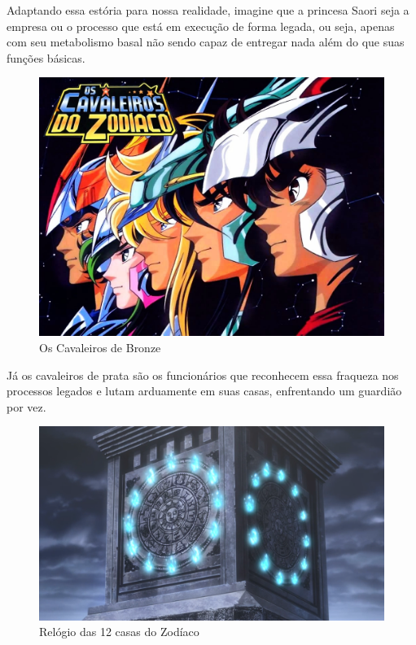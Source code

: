 Adaptando essa estória para nossa realidade, imagine que a princesa Saori seja a empresa ou o processo que está em execução de forma legada, ou seja, apenas com seu metabolismo basal não sendo capaz de entregar nada além do que suas funções básicas.

\begin{figure}[H]
    \centering
    \includegraphics[scale=0.33,keepaspectratio=true]{images/05.jpg}
    \caption{Os Cavaleiros de Bronze}
\end{figure}

Já os cavaleiros de prata são os funcionários que reconhecem essa fraqueza nos processos legados e lutam arduamente em suas casas, enfrentando um guardião por vez.

\begin{figure}[H]
    \centering
    \includegraphics[scale=0.35,keepaspectratio=true]{images/07.png}
    \caption{Relógio das 12 casas do Zodíaco}
\end{figure}

